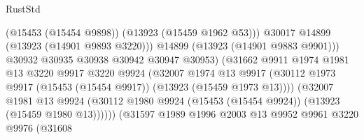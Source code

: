 \begin{lexlean}{RustStd}
\begin{coremodule}
                                                (@15453 (@15454 @9898))
                                                (@13923 (@15459 @1962 @53)))
                                              @30017
                                              @14899
                                              (@13923 (@14901 @9893 @3220)))
                                            @14899
                                            (@13923 (@14901 @9883 @9901)))
                                          @30932
                                          @30935
                                          @30938
                                          @30942
                                          @30947
                                          @30953)
                                        (@31662
                                          @9911
                                          @1974
                                          @1981
                                          @13
                                          @3220
                                          @9917
                                          @3220
                                          @9924
                                          (@32007
                                            @1974
                                            @13
                                            @9917
                                            (@30112
                                              @1973
                                              @9917
                                              (@15453 (@15454 @9917))
                                              (@13923 (@15459 @1973 @13))))
                                          (@32007
                                            @1981
                                            @13
                                            @9924
                                            (@30112
                                              @1980
                                              @9924
                                              (@15453 (@15454 @9924))
                                              (@13923 (@15459 @1980 @13))))))
                                      (@31597
                                        @1989
                                        @1996
                                        @2003
                                        @13
                                        @9952
                                        @9961
                                        @3220
                                        @9976
                                        (@31608

\end{coremodule}
\end{lexlean}
